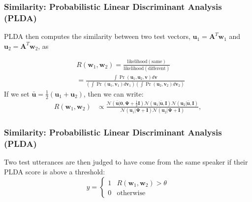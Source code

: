 \documentclass{beamer}
\begin{document}
\begin{frame}
  \frametitle{Similarity: Probabilistic Linear Discriminant Analysis (PLDA)}

  PLDA then computes the similarity between two test vectors,
  $\bm{u}_1=\bm{A}^T\bm{w}_1$ and $\bm{u}_2=\bm{A}^T\bm{w}_2$, as

  \begin{align*}
    &R(\bm{w}_1,\bm{w}_2)=\frac{\text{likelihood}(\text{same})}{\text{likelihood}(\text{different})}\\
    &=\frac{\int\Pr(\bm{u}_1,\bm{u}_2,\bm{v})d\bm{v}}{\left(\int\Pr(\bm{u}_1,\bm{v}_1)d\bm{v}_1\right)\left(\int\Pr(\bm{u}_2,\bm{v}_2)d\bm{v}_2\right)}
  \end{align*}
  If we set $\bar{\bm{u}}=\frac{1}{2}\left(\bm{u}_1+\bm{u}_2\right)$, then we can write:
  \begin{align*}
    R(\bm{w}_1,\bm{w}_2)
    &\propto\frac{\mathcal{N}\left(\bar{\bm{u}}\vert\bm{0},\bm{\Psi}+\frac{1}{2}\bm{I}\right)\mathcal{N}\left(\bm{u}_1\vert\bar{\bm{u}},\bm{I}\right)\mathcal{N}\left(\bm{u}_2\vert\bar{\bm{u}},\bm{I}\right)}{\mathcal{N}\left(\bm{u}_1\vert\bm{\Psi}+\bm{I}\right)\mathcal{N}\left(\bm{u}_2\vert\bm{\Psi}+\bm{I}\right)},
  \end{align*}
\end{frame}



\begin{frame}
  \frametitle{Similarity: Probabilistic Linear Discriminant Analysis (PLDA)}

  Two test utterances are then judged to have come from the same
  speaker if their PLDA score is above a threshold:
  \begin{displaymath}
    y =\begin{cases}
    1 & R(\bm{w}_1,\bm{w}_2)>\theta\\
    0 &\mbox{otherwise}
    \end{cases}
  \end{displaymath}
\end{frame}
\end{document}
